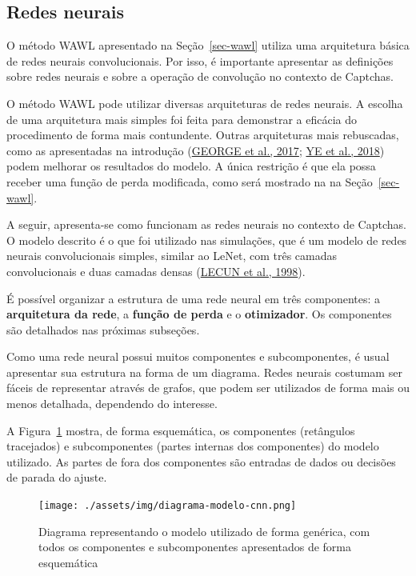 \documentclass[12pt,twoside,brazilian]{book}
\begin{document}
\hypertarget{redes-neurais}{%
\subsection{Redes neurais}\label{redes-neurais}}

O método WAWL apresentado na Seção~\ref{sec-wawl} utiliza uma
arquitetura básica de redes neurais convolucionais. Por isso, é
importante apresentar as definições sobre redes neurais e sobre a
operação de convolução no contexto de Captchas.

O método WAWL pode utilizar diversas arquiteturas de redes neurais. A
escolha de uma arquitetura mais simples foi feita para demonstrar a
eficácia do procedimento de forma mais contundente. Outras arquiteturas
mais rebuscadas, como as apresentadas na introdução
(\protect\hyperlink{ref-george2017}{GEORGE et al., 2017};
\protect\hyperlink{ref-ye2018}{YE et al., 2018}) podem melhorar os
resultados do modelo. A única restrição é que ela possa receber uma
função de perda modificada, como será mostrado na na
Seção~\ref{sec-wawl}.

A seguir, apresenta-se como funcionam as redes neurais no contexto de
Captchas. O modelo descrito é o que foi utilizado nas simulações, que é
um modelo de redes neurais convolucionais simples, similar ao LeNet, com
três camadas convolucionais e duas camadas densas
(\protect\hyperlink{ref-lecun1998}{LECUN et al., 1998}).

É possível organizar a estrutura de uma rede neural em três componentes:
a \textbf{arquitetura da rede}, a \textbf{função de perda} e o
\textbf{otimizador}. Os componentes são detalhados nas próximas
subseções.

Como uma rede neural possui muitos componentes e subcomponentes, é usual
apresentar sua estrutura na forma de um diagrama. Redes neurais costumam
ser fáceis de representar através de grafos, que podem ser utilizados de
forma mais ou menos detalhada, dependendo do interesse.

A Figura~\ref{fig-diagrama-modelo-cnn} mostra, de forma esquemática, os
componentes (retângulos tracejados) e subcomponentes (partes internas
dos componentes) do modelo utilizado. As partes de fora dos componentes
são entradas de dados ou decisões de parada do ajuste.

\begin{figure}

{\centering \texttt{[image: ./assets/img/diagrama-modelo-cnn.png]}

}

\caption{\label{fig-diagrama-modelo-cnn}Diagrama representando o modelo
utilizado de forma genérica, com todos os componentes e subcomponentes
apresentados de forma esquemática}

\end{figure}
\end{document}

